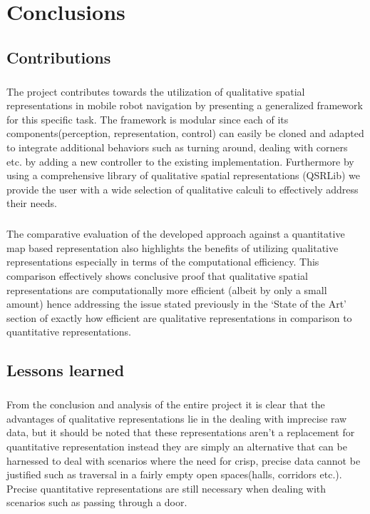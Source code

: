 
\chapter{Conclusions}

\section{Contributions}
\paragraph{}The project contributes towards the utilization of qualitative spatial representations in mobile robot navigation by presenting a generalized framework for this specific task. The framework is modular since each of its components(perception, representation, control) can easily be cloned and adapted to integrate additional behaviors such as turning around, dealing with corners etc. by adding a new controller to the existing implementation. Furthermore by using a comprehensive library of qualitative spatial representations (QSRLib) we provide the user with a wide selection of qualitative calculi to effectively address their needs.

\paragraph{}The comparative evaluation of the developed approach against a quantitative map based representation also highlights the benefits of utilizing qualitative representations especially in terms of the computational efficiency. This comparison effectively shows conclusive proof that qualitative spatial representations are computationally more efficient (albeit by only a small amount) hence addressing the issue stated previously in the `State of the Art' section of exactly how efficient are qualitative representations in comparison to quantitative representations. 

\section{Lessons learned}

\paragraph{} From the conclusion and analysis of the entire project it is clear that the advantages of qualitative representations lie in the dealing with imprecise raw data, but it should be noted that these representations aren't a replacement for quantitative representation instead they are simply an alternative that can be harnessed to deal with scenarios where the need for crisp, precise data cannot be justified such as traversal in a fairly empty open spaces(halls, corridors etc.). Precise quantitative representations are still necessary when dealing with scenarios such as passing through a door.


